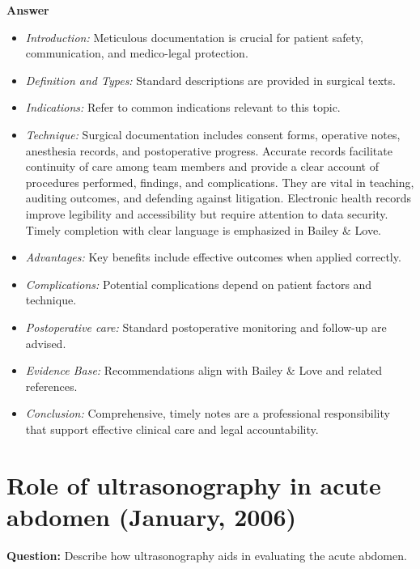 \documentclass{article}
\begin{document}
\textbf{Answer}
\begin{itemize}

\item \emph{Introduction:} Meticulous documentation is crucial for patient safety, communication, and medico-legal protection.
\item \emph{Definition and Types:} Standard descriptions are provided in surgical texts.
\item \emph{Indications:} Refer to common indications relevant to this topic.

\item \emph{Technique:} Surgical documentation includes consent forms, operative notes, anesthesia records, and postoperative progress. Accurate records facilitate continuity of care among team members and provide a clear account of procedures performed, findings, and complications. They are vital in teaching, auditing outcomes, and defending against litigation. Electronic health records improve legibility and accessibility but require attention to data security. Timely completion with clear language is emphasized in Bailey \& Love.
\item \emph{Advantages:} Key benefits include effective outcomes when applied correctly.
\item \emph{Complications:} Potential complications depend on patient factors and technique.
\item \emph{Postoperative care:} Standard postoperative monitoring and follow-up are advised.
\item \emph{Evidence Base:} Recommendations align with Bailey \& Love and related references.

\item \emph{Conclusion:} Comprehensive, timely notes are a professional responsibility that support effective clinical care and legal accountability.


\end{itemize}

\section{Role of ultrasonography in acute abdomen (January, 2006)}

\textbf{Question:} Describe how ultrasonography aids in evaluating the acute abdomen.
\end{document}
